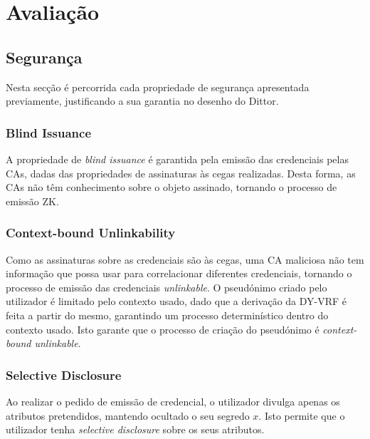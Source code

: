 
%

\chapter{Avaliação}
\label{cha:avaliacao}

\section{Segurança}
\label{sec:avaliacao_seguranca}

Nesta secção é percorrida cada propriedade de segurança apresentada previamente, justificando a sua garantia no desenho do Dittor.

\subsection{Blind Issuance}

A propriedade de \textit{blind issuance} é garantida pela emissão das credenciais pelas CAs, dadas das propriedades de assinaturas às cegas realizadas. Desta forma, as CAs não têm conhecimento sobre o objeto assinado, tornando o processo de emissão ZK.

\subsection{Context-bound Unlinkability}

Como as assinaturas sobre as credenciais são às cegas, uma CA maliciosa não tem informação que possa usar para correlacionar diferentes credenciais, tornando o processo de emissão das credenciais \textit{unlinkable}. O pseudónimo criado pelo utilizador é limitado pelo contexto usado, dado que a derivação da DY-VRF é feita a partir do mesmo, garantindo um processo determinístico dentro do contexto usado. Isto garante que o processo de criação do pseudónimo é \textit{context-bound unlinkable}.

\subsection{Selective Disclosure}

Ao realizar o pedido de emissão de credencial, o utilizador divulga apenas os atributos pretendidos, mantendo ocultado o seu segredo $x$. Isto permite que o utilizador tenha \textit{selective disclosure} sobre os seus atributos.

